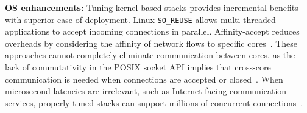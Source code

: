 {\bf OS enhancements:} Tuning kernel-based stacks provides incremental
benefits with superior ease of deployment.  Linux \texttt{SO\_REUSE}
allows multi-threaded applications to accept incoming connections in
parallel. Affinity-accept reduces overheads by considering the
affinity of network flows to specific
cores~\cite{DBLP:conf/eurosys/PesterevSZM12}. These approaches cannot
completely eliminate communication between cores, as the lack of
commutativity in the POSIX socket API implies that cross-core
communication is needed when connections are accepted or
closed~\cite{DBLP:conf/sosp/ClementsKZMK13}. When microsecond
latencies are irrelevant, such as Internet-facing communication
services, properly tuned stacks can support millions of concurrent
connections~\cite{whatsapp-2mil}.
